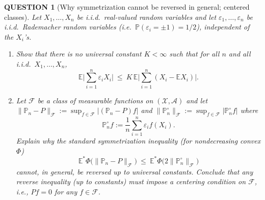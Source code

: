 \documentclass[12pt]{article}
\renewcommand{\(}{\left(}%
\renewcommand{\)}{\right)}%
\renewcommand{\[}{\left[}%
\renewcommand{\]}{\right]}%
\newtheorem{question}{QUESTION}[section]}
\begin{document}
\begin{question}[Why symmetrization cannot be reversed in general; centered classes]
Let $X_1,\dots,X_n$ be i.i.d.\ real-valued random variables and let $\varepsilon_1,\dots,\varepsilon_n$
be i.i.d.\ Rademacher random variables (i.e.\ $\mathbb P(\varepsilon_i=\pm1)=1/2$), independent of the
$X_i$'s.

\begin{enumerate}
\item Show that there is \emph{no} universal constant $K<\infty$ such that for \emph{all} $n$ and \emph{all}
i.i.d.\ $X_1,\dots,X_n$,
\begin{equation*}
\mathbb E\Big|\sum_{i=1}^n \varepsilon_i X_i\Big|
\ \le\
K\,\mathbb E\Big|\sum_{i=1}^n (X_i-\mathbb E X_i)\Big|.
\end{equation*}

\item Let $\mathcal F$ be a class of measurable functions on $(\mathcal X,\mathcal A)$ and let
$\|\mathbb P_n-P\|_{\mathcal F}:=\sup_{f\in\mathcal F}|(\mathbb P_n-P)f|$ and
$\|\mathbb P_n^\circ\|_{\mathcal F}:=\sup_{f\in\mathcal F}|\mathbb P_n^\circ f|$ where
\begin{equation*}
\mathbb P_n^\circ f:=\frac1n\sum_{i=1}^n \varepsilon_i f(X_i).
\end{equation*}
Explain why the standard symmetrization inequality (for nondecreasing convex $\Phi$)
\begin{equation*}
\mathbb E^*\Phi\big(\|\mathbb P_n-P\|_{\mathcal F}\big)
\ \le\
\mathbb E^*\Phi\big(2\|\mathbb P_n^\circ\|_{\mathcal F}\big)
\end{equation*}
cannot, in general, be reversed up to universal constants. Conclude that any reverse inequality (up to
constants) must impose a \emph{centering} condition on $\mathcal F$, i.e., $Pf=0$ for any $f\in\mathcal F$.
\end{enumerate}
\end{question}
\end{document}
